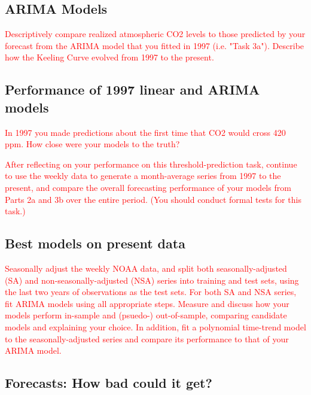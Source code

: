 \documentclass[AER]{AEA}
\begin{document}
\hypertarget{arima-models}{%
\subsection{ARIMA Models}\label{arima-models}}

\textcolor{red}{Descriptively compare realized atmospheric CO2 levels to those predicted by your forecast from the ARIMA model that you fitted in 1997 (i.e. "Task 3a"). Describe how the Keeling Curve evolved from 1997 to the present.}

\hypertarget{performance-of-1997-linear-and-arima-models}{%
\subsection{Performance of 1997 linear and ARIMA
models}\label{performance-of-1997-linear-and-arima-models}}

\textcolor{red}{In 1997 you made predictions about the first time that CO2 would cross 420 ppm. How close were your models to the truth?}

\textcolor{red}{After reflecting on your performance on this threshold-prediction task, continue to use the weekly data to generate a month-average series from 1997 to the present, and compare the overall forecasting performance of your models from Parts 2a and 3b over the entire period. (You should conduct formal tests for this task.)}

\hypertarget{best-models-on-present-data}{%
\subsection{Best models on present
data}\label{best-models-on-present-data}}

\textcolor{red}{Seasonally adjust the weekly NOAA data, and split both seasonally-adjusted (SA) and non-seasonally-adjusted (NSA) series into training and test sets, using the last two years of observations as the test sets. For both SA and NSA series, fit ARIMA models using all appropriate steps. Measure and discuss how your models perform in-sample and (psuedo-) out-of-sample, comparing candidate models and explaining your choice. In addition, fit a polynomial time-trend model to the seasonally-adjusted series and compare its performance to that of your ARIMA model.}

\hypertarget{forecasts-how-bad-could-it-get}{%
\subsection{Forecasts: How bad could it
get?}\label{forecasts-how-bad-could-it-get}}
\end{document}
